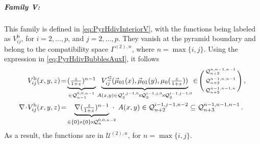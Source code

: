 \subparagraph{Family V:}
This family is defined in \eqref{eq:PyrHdivInteriorV}, with the functions being labeled as $V_{ij}^\mathrm{b}$, for $i=2,\ldots,p$, and $j=2,\ldots,p$.
They vanish at the pyramid boundary and belong to the compatibility space $\Gamma^{(2),n}$, where $n=\max\{i,j\}$.
Using the expression in \eqref{eq:PyrHdivBubblesAuxI}, it follows
\begin{equation}
\begin{aligned}
	V_{ij}^\mathrm{b}(x,y,z)&\!=\!
		\underbrace{(\textstyle{\frac{z}{1+z}})^{n-1}}_{\in\mathcal{Q}_{n-1}^{0,0,n-1}}
			\underbrace{V_{ij}^\trianglelefteq(\vec{\mu}_{01}(x),\vec{\mu}_{01}(y),\mu_0(\szzz))}_{A(x,y)
				\in\mathcal{Q}_3^{i,j-1,0}\!\times\!\mathcal{Q}_3^{i-1,j,0}\!\times\!\mathcal{Q}_2^{i-1,j-1,0}}
						\!\in\!\Bigg(\begin{smallmatrix}\mathcal{Q}_{n+2}^{n,n-1,n-1}\\[2pt]\mathcal{Q}_{n+2}^{n-1,n,n-1}\\[2pt]
							\mathcal{Q}_{n+2}^{n-1,n-1,n}\end{smallmatrix}\Bigg)\,,\\
	\nabla\!\cdot\! V_{ij}^\mathrm{b}(x,y,z)&\!=\!
		\underbrace{\nabla (\textstyle{\frac{z}{1+z}})^{n-1}}_{
			\in\{0\}\!\times\!\{0\}\!\times\!\mathcal{Q}_{n}^{0,0,n-2}}
				\!\!\!\!\cdot\,\,\, A(x,y)\in\mathcal{Q}_{n+2}^{i-1,j-1,n-2}
					\subseteq\mathcal{Q}_{n+3}^{n-1,n-1,n-1}\,.
\end{aligned}
\end{equation}
As a result, the functions are in $\mathcal{U}^{(2),n}$, for $n=\max\{i,j\}$.

